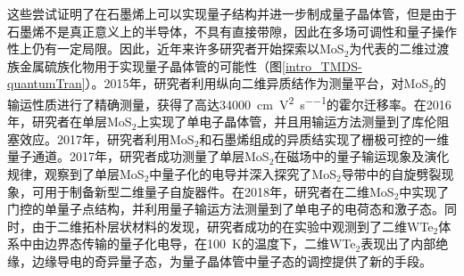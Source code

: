     这些尝试证明了在石墨烯上可以实现量子结构并进一步制成量子晶体管，但是由于石墨烯不是真正意义上的半导体，不具有直接带隙，因此在多场可调性和量子操作性上仍有一定局限。因此，近年来许多研究者开始探索以MoS$_2$为代表的二维过渡族金属硫族化物用于实现量子晶体管的可能性（图\ref{intro_TMDS-quantumTran}）。2015年，研究者利用纵向二维异质结作为测量平台，对MoS$_2$的输运性质进行了精确测量，获得了高达\SI{34000}{\centi\meter\per\volt\squared\per\second}的霍尔迁移率。在2016年，研究者在单层MoS$_2$上实现了单电子晶体管，并且用输运方法测量到了库伦阻塞效应。2017年，研究者利用MoS$_2$和石墨烯组成的异质结实现了栅极可控的一维量子通道。2017年，研究者成功测量了单层MoS$_2$在磁场中的量子输运现象及演化规律，观察到了单层MoS$_2$中量子化的电导并深入探究了MoS$_2$导带中的自旋劈裂现象，可用于制备新型二维量子自旋器件。在2018年，研究者在二维MoS$_2$中实现了门控的单量子点结构，并利用量子输运方法测量到了单电子的电荷态和激子态。同时，由于二维拓朴层状材料的发现，研究者成功的在实验中观测到了二维WTe$_2$体系中由边界态传输的量子化电导，在\SI{100}{\kelvin}的温度下，二维WTe$_2$表现出了内部绝缘，边缘导电的奇异量子态，为量子晶体管中量子态的调控提供了新的手段。

